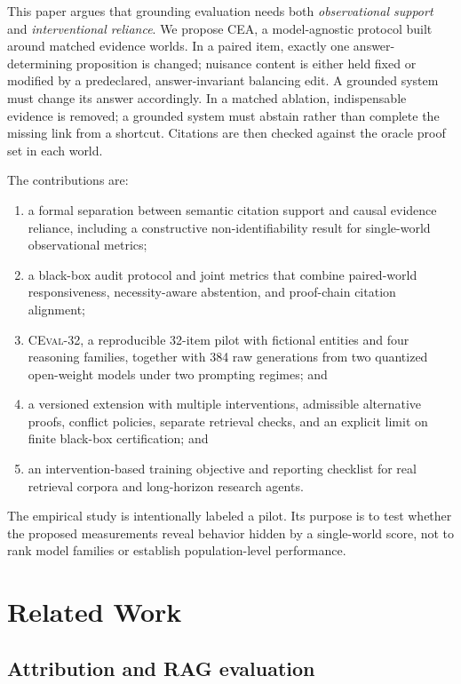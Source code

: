 \documentclass[10pt,twocolumn]{article}
\newcommand{\method}{\textsc{CEA}}
\newcommand{\dataset}{\textsc{CEval-32}}
\begin{document}
This paper argues that grounding evaluation needs both \emph{observational support} and \emph{interventional reliance}. We propose \method, a model-agnostic protocol built around matched evidence worlds. In a paired item, exactly one answer-determining proposition is changed; nuisance content is either held fixed or modified by a predeclared, answer-invariant balancing edit. A grounded system must change its answer accordingly. In a matched ablation, indispensable evidence is removed; a grounded system must abstain rather than complete the missing link from a shortcut. Citations are then checked against the oracle proof set in each world.

The contributions are:
\begin{enumerate}[leftmargin=*,itemsep=2pt,topsep=3pt]
    \item a formal separation between semantic citation support and causal evidence reliance, including a constructive non-identifiability result for single-world observational metrics;
    \item a black-box audit protocol and joint metrics that combine paired-world responsiveness, necessity-aware abstention, and proof-chain citation alignment;
    \item \dataset, a reproducible 32-item pilot with fictional entities and four reasoning families, together with 384 raw generations from two quantized open-weight models under two prompting regimes; and
    \item a versioned extension with multiple interventions, admissible alternative proofs, conflict policies, separate retrieval checks, and an explicit limit on finite black-box certification; and
    \item an intervention-based training objective and reporting checklist for real retrieval corpora and long-horizon research agents.
\end{enumerate}

The empirical study is intentionally labeled a pilot. Its purpose is to test whether the proposed measurements reveal behavior hidden by a single-world score, not to rank model families or establish population-level performance.

\section{Related Work}

\subsection{Attribution and RAG evaluation}
\end{document}
